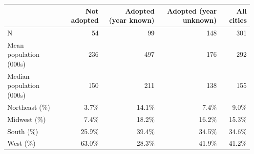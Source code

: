 \begin{tabular}{lrrrr}
\toprule
& Not adopted & Adopted (year known) & Adopted (year unknown) & All cities \\
\midrule
N & 54 & 99 & 148 & 301 \\
\midrule
Mean population (000s) & 236 & 497 & 176 & 292 \\
Median population (000s) & 150 & 211 & 138 & 155 \\
\midrule
  Northeast (\%) & 3.7\% & 14.1\% & 7.4\% & 9.0\% \\
  Midwest (\%) & 7.4\% & 18.2\% & 16.2\% & 15.3\% \\
  South (\%) & 25.9\% & 39.4\% & 34.5\% & 34.6\% \\
  West (\%) & 63.0\% & 28.3\% & 41.9\% & 41.2\% \\
\bottomrule
\end{tabular}